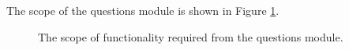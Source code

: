 The scope of the questions module is shown in Figure \ref{fig:questions_scope}. 

\begin{figure}[htb]
\begin{center}
\end{center}
\caption{The scope of functionality required from the questions module. \label{fig:questions_scope}}
\end{figure}



